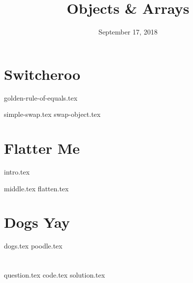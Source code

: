 \documentclass[11pt]{exam}
\title{Objects \& Arrays}
\date{September 17, 2018}
\begin{document}
\maketitle

\section{Switcheroo}
{golden-rule-of-equals.tex}
\begin{questions}
{simple-swap.tex}
{swap-object.tex}
\end{questions}

\newpage
\section{Flatter Me}
{intro.tex}
\begin{questions}
{middle.tex}
{flatten.tex}
\end{questions}

\section{Dogs Yay}
\begin{questions}
{dogs.tex}
{poodle.tex}
\end{questions}

\clearpage

\section{}
\begin{questions}
{question.tex}
{code.tex}
{solution.tex}
\end{questions}
\end{document}
